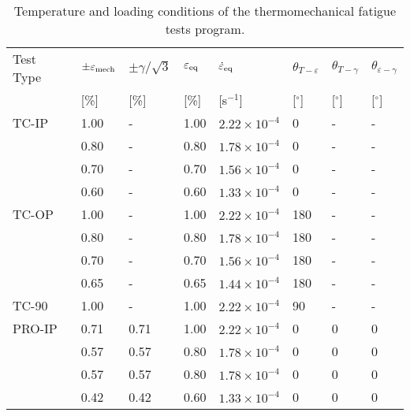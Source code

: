 
\begin{table}[htbp]
  \centering
  \caption{Temperature and loading conditions of the thermomechanical fatigue tests program.}
    \begin{tabular}{p{2cm}<{\centering}p{1.5cm}<{\centering}p{1.5cm}<{\centering}p{1.5cm}<{\centering}p{2.5cm}<{\centering}p{1cm}<{\centering}p{1cm}<{\centering}p{1cm}<{\centering}}
    \toprule
    Test Type & $\pm \varepsilon_{\rm{mech}}$ & $\pm \gamma/ \sqrt 3$ & $\varepsilon_{\rm{eq}}$ & $\dot \varepsilon_{\rm{eq}}$ & $\theta_{T-\varepsilon}$ & $\theta_{T-\gamma}$ & $\theta_{\varepsilon-\gamma}$ \\
          & [\%]  & [\%]  & [\%]  & [s$^{-1}$] & [$^\circ$] & [$^\circ$] & [$^\circ$] \\
    \midrule
    TC-IP & 1.00  & -     & 1.00  & $2.22\times 10^{-4}$ & 0     & -     & - \\
          & 0.80  & -     & 0.80  & $1.78\times 10^{-4}$ & 0     & -     & - \\
          & 0.70  & -     & 0.70  & $1.56\times 10^{-4}$ & 0     & -     & - \\
          & 0.60  & -     & 0.60  & $1.33\times 10^{-4}$ & 0     & -     & - \\
    \midrule
    TC-OP & 1.00  & -     & 1.00  & $2.22\times 10^{-4}$ & 180   & -     & - \\
          & 0.80  & -     & 0.80  & $1.78\times 10^{-4}$ & 180   & -     & - \\
          & 0.70  & -     & 0.70  & $1.56\times 10^{-4}$ & 180   & -     & - \\
          & 0.65  & -     & 0.65  & $1.44\times 10^{-4}$ & 180   & -     & - \\
    \midrule
    TC-90 & 1.00  & -     & 1.00  & $2.22\times 10^{-4}$ & 90    & -     & - \\
    \midrule
    PRO-IP & 0.71  & 0.71  & 1.00  & $2.22\times 10^{-4}$ & 0     & 0     & 0 \\
          & 0.57  & 0.57  & 0.80  & $1.78\times 10^{-4}$ & 0     & 0     & 0 \\
          & 0.57  & 0.57  & 0.80  & $1.78\times 10^{-4}$ & 0     & 0     & 0 \\
          & 0.42  & 0.42  & 0.60  & $1.33\times 10^{-4}$ & 0     & 0     & 0 \\

\end{tabular}
\end{table}
